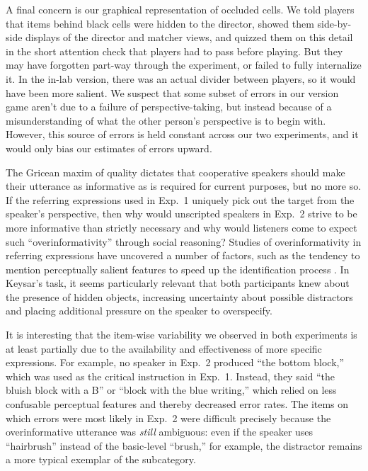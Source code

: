 \documentclass[10pt,letterpaper]{article}
\begin{document}
A final concern is our graphical representation of occluded cells. We told players that items behind black cells were hidden to the director, showed them side-by-side displays of the director and matcher views, and quizzed them on this detail in the short attention check that players had to pass before playing. But they may have forgotten part-way through the experiment, or failed to fully internalize it. In the in-lab version, there was an actual divider between players, so it would have been more salient. We suspect that some subset of errors in our version game aren't due to a failure of perspective-taking, but instead because of a misunderstanding of what the other person's perspective is to begin with. However, this source of errors is held constant across our two experiments, and it would only bias our estimates of errors upward.

The Gricean maxim of quality dictates that cooperative speakers should make their utterance as informative as is required for current purposes, but no more so. If the referring expressions used in Exp.~1 uniquely pick out the target from the speaker's perspective, then why would unscripted speakers in Exp.~2 strive to be more informative than strictly necessary and why would listeners come to expect such ``overinformativity'' through social reasoning? Studies of overinformativity in referring expressions have uncovered a number of factors, such as the tendency to mention perceptually salient features to speed up the identification process  \cite{KoolenGattGoudbeekKrahmer11_Overspecification}. In Keysar's task, it seems particularly relevant that both participants knew about the presence of hidden objects, increasing uncertainty about possible distractors and placing additional pressure on the speaker to overspecify. 

It is interesting that the item-wise variability we observed in both experiments is at least partially due to the availability and effectiveness of more specific expressions. For example, no speaker in Exp.~2 produced ``the bottom block,'' which was used as the critical instruction in Exp.~1. Instead, they said ``the bluish block with a B'' or ``block with the blue writing,'' which relied on less confusable perceptual features and thereby decreased error rates. The items on which errors were most likely in Exp.~2 were difficult precisely because the overinformative utterance was \emph{still} ambiguous: even if the speaker uses ``hairbrush'' instead of the basic-level ``brush,'' for example, the distractor remains a more typical exemplar of the subcategory. 
\end{document}

